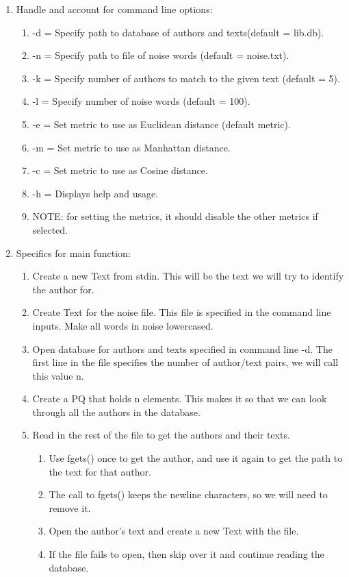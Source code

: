 \documentclass[11pt]{article}
\begin{document}
\begin{enumerate}
\item Handle and account for command line options:
	\begin{enumerate}
	\item -d = Specify path to database of authors and texts(default = lib.db).
	\item -n = Specify path to file of noise words (default = noise.txt).
	\item -k = Specify number of authors to match to the given text (default = 5).
	\item -l = Specify number of noise words (default = 100).
	\item -e = Set metric to use as Euclidean distance (default metric).
	\item -m = Set metric to use as Manhattan distance.
	\item -c = Set metric to use as Cosine distance.
	\item -h = Displays help and usage.
	\item NOTE: for setting the metrics, it should disable the other metrics if selected.
	\end{enumerate}
\item Specifics for main function:
	\begin{enumerate}
	\item Create a new Text from stdin. This will be the text we will try to identify the author for.
	\item Create Text for the noise file. This file is specified in the command line inputs. Make all words in noise lowercased.
	\item Open database for authors and texts specified in command line -d. The first line in the file specifies the number of author/text pairs, we will call this value n.
	\item Create a PQ that holds n elements. This makes it so that we can look through all the authors in the database.
	\item Read in the rest of the file to get the authors and their texts.
		\begin{enumerate}
		\item Use fgets() once to get the author, and use it again to get the path to the text for that author.
		\item The call to fgets() keeps the newline characters, so we will need to remove it.
		\item Open the author's text and create a new Text with the file.
		\item If the file fails to open, then skip over it and continue reading the database.

\end{enumerate}
\end{enumerate}
\end{enumerate}
\end{document}
